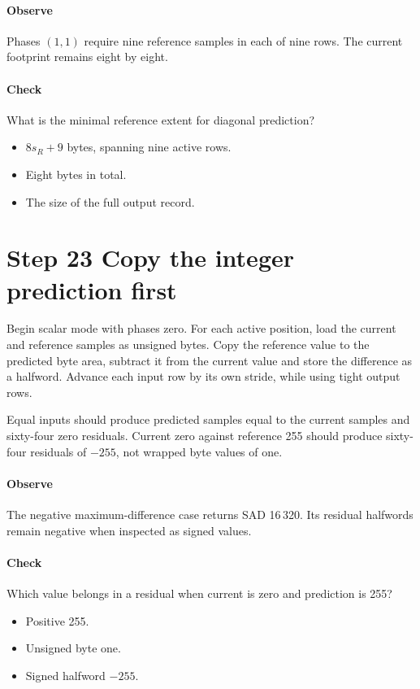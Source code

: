 \paragraph{Observe} Phases $(1,1)$ require nine reference samples in each of
nine rows. The current footprint remains eight by eight.
\paragraph{Check} What is the minimal reference extent for diagonal prediction?
\begin{itemize}
  \item[A.] $8s_R+9$ bytes, spanning nine active rows.
  \item[B.] Eight bytes in total.
  \item[C.] The size of the full output record.
\end{itemize}

\section{Step 23 Copy the integer prediction first}\label{h263-prediction-s03}
Begin scalar mode with phases zero. For each active position, load the current
and reference samples as unsigned bytes. Copy the reference value to the predicted
byte area, subtract it from the current value and store the difference as a
halfword. Advance each input row by its own stride, while using tight output rows.

Equal inputs should produce predicted samples equal to the current samples and
sixty-four zero residuals. Current zero against reference 255 should produce
sixty-four residuals of $-255$, not wrapped byte values of one.

\paragraph{Observe} The negative maximum-difference case returns SAD 16\,320.
Its residual halfwords remain negative when inspected as signed values.
\paragraph{Check} Which value belongs in a residual when current is zero and prediction is 255?
\begin{itemize}
  \item[A.] Positive 255.
  \item[B.] Unsigned byte one.
  \item[C.] Signed halfword $-255$.
\end{itemize}


